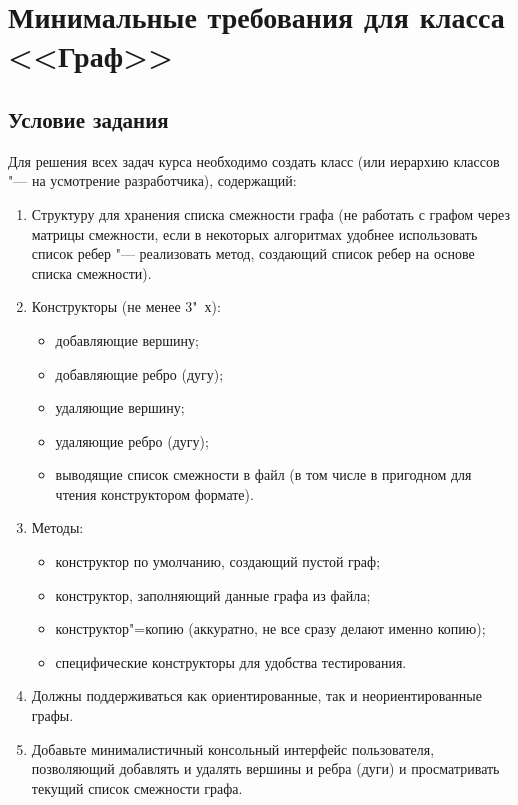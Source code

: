 \section{Минимальные требования для класса <<Граф>>}
\subsection{Условие задания}
Для решения всех задач курса необходимо создать класс (или иерархию
классов "--- на усмотрение разработчика), содержащий:
\begin{enumerate}
  \item Структуру для хранения списка смежности графа (не работать с графом
  через матрицы смежности, если в некоторых алгоритмах удобнее использовать
  список ребер "--- реализовать метод, создающий список ребер на
  основе списка смежности).
  \item Конструкторы (не менее 3"~х):
  \begin{itemize}
    \item добавляющие вершину;
    \item добавляющие ребро (дугу);
    \item удаляющие вершину;
    \item удаляющие ребро (дугу);
    \item выводящие список смежности в файл (в том числе в пригодном для
    чтения конструктором формате).
  \end{itemize}
  \item Методы:
  \begin{itemize}
    \item конструктор по умолчанию, создающий пустой граф;
    \item конструктор, заполняющий данные графа из файла;
    \item конструктор"=копию (аккуратно, не все сразу делают именно копию);
    \item специфические конструкторы для удобства тестирования.
  \end{itemize}
  \item Должны поддерживаться как ориентированные, так и неориентированные
  графы.
  \item Добавьте минималистичный консольный интерфейс пользователя, позволяющий
  добавлять и удалять вершины и ребра (дуги) и просматривать
  текущий список смежности графа.
\end{enumerate}

